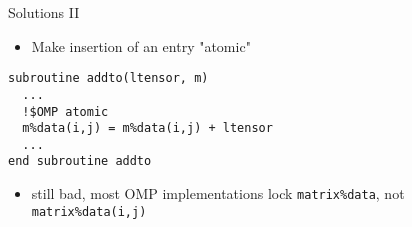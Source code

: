 \documentclass[bigger]{beamer}
\begin{document}
\begin{frame}[fragile,label={sec:orgheadline20}]{Solutions II}
 \begin{itemize}
\item Make insertion of an entry "atomic"
\end{itemize}
\begin{verbatim}
subroutine addto(ltensor, m)
  ...
  !$OMP atomic
  m%data(i,j) = m%data(i,j) + ltensor
  ...
end subroutine addto
\end{verbatim}

\begin{itemize}
\item still bad, most OMP implementations lock \texttt{matrix\%data}, not
\texttt{matrix\%data(i,j)}
\end{itemize}
\end{frame}
\end{document}
